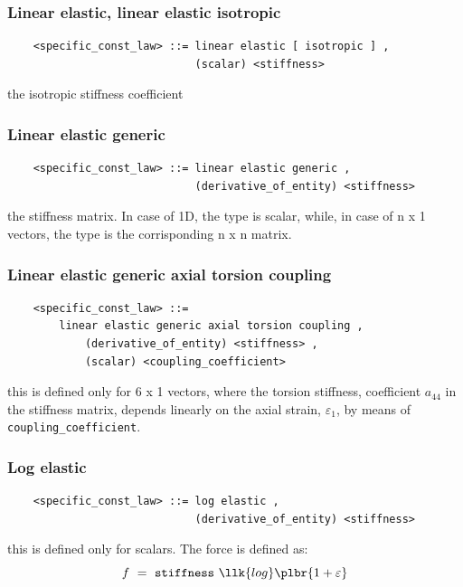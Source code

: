 \documentclass[10pt,dvips]{report}
\begin{document}
\subsubsection{Linear elastic, linear elastic isotropic}
\begin{verbatim}
    <specific_const_law> ::= linear elastic [ isotropic ] , 
                             (scalar) <stiffness>
\end{verbatim}
the isotropic stiffness coefficient
  
  
\subsubsection{Linear elastic generic}
\begin{verbatim}
    <specific_const_law> ::= linear elastic generic ,  
                             (derivative_of_entity) <stiffness>
\end{verbatim}
the stiffness matrix. In case of 1D, the type is scalar, while, in case of 
n x 1 vectors, the type is the corrisponding n x n matrix.

\subsubsection{Linear elastic generic axial torsion coupling}
\begin{verbatim}
    <specific_const_law> ::= 
        linear elastic generic axial torsion coupling ,  
            (derivative_of_entity) <stiffness> ,
            (scalar) <coupling_coefficient>
\end{verbatim}
this is defined only for 6 x 1 vectors, where the torsion stiffness,
coefficient $ a_{44} $ in the stiffness matrix, depends linearly on 
the axial strain, $ \varepsilon_1 $, by means of 
{\tt coupling\_coefficient}.
  
\subsubsection{Log elastic}
\begin{verbatim}
    <specific_const_law> ::= log elastic ,
                             (derivative_of_entity) <stiffness>      
\end{verbatim}
this is defined only for scalars. The force is defined as:
\begin{displaymath}
    f \ = \ {\tt stiffness} \ \llk{log}\plbr{1+\varepsilon}
\end{displaymath}
  
\end{document}
